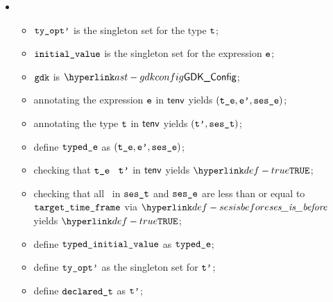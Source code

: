 \ProseParagraph
\OneApplies
\begin{itemize}
  \item {}
  \begin{itemize}
    \item $\texttt{ty\_opt'}$ is the singleton set for the type $\texttt{t}$;
    \item $\texttt{initial\_value}$ is the singleton set for the expression $\texttt{e}$;
    \item $\texttt{gdk}$ is $\GDKConfig$;
    \item annotating the expression $\texttt{e}$ in $\textsf{tenv}$ yields $(\texttt{t\_e}, \texttt{e'}, \texttt{ses\_e})$\ProseOrTypeError;
    \item annotating the type $\texttt{t}$ in $\textsf{tenv}$ yields $(\texttt{t'}, \texttt{ses\_t})$\ProseOrTypeError;
    \item define $\texttt{typed\_e}$ as $(\texttt{t\_e}, \texttt{e'}, \texttt{ses\_e})$;
    \item checking that $\texttt{t\_e}$ \typesatisfies\ $\texttt{t'}$ in $\textsf{tenv}$ yields $\True$\ProseOrTypeError;
    \item checking that all \timeframesterm\ in $\texttt{ses\_t}$ and $\texttt{ses\_e}$ are less than or equal to \\
          $\texttt{target\_time\_frame}$ via $\sesisbefore$ yields $\True$\ProseOrTypeError;
    \item define $\texttt{typed\_initial\_value}$ as $\texttt{typed\_e}$;
    \item define $\texttt{ty\_opt'}$ as the singleton set for $\texttt{t'}$;
    \item define $\texttt{declared\_t}$ as $\texttt{t'}$;
  \end{itemize}


\end{itemize}
